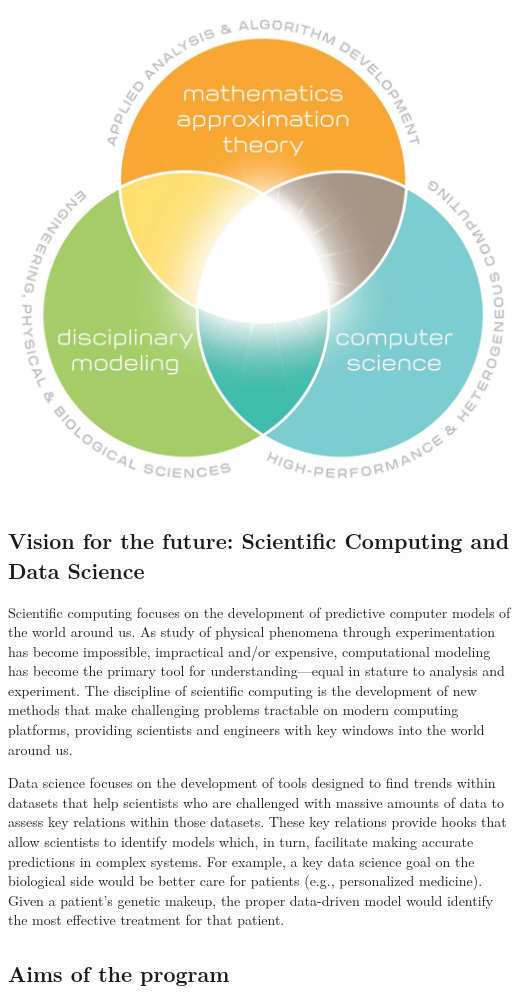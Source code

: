 \documentclass[%
oneside,                 %
final,                   %
10pt]{article}
\begin{document}
\centerline{\includegraphics[width=0.6\linewidth]{figslides/cs.jpg}}

\vspace{6mm}

\subsection*{Vision for the future: Scientific Computing and Data Science}

Scientific computing focuses on the development of predictive computer
models of the world around us. As study of physical phenomena through
experimentation has become impossible, impractical and/or expensive,
computational modeling has become the primary tool for
understanding—equal in stature to analysis and experiment. 
The discipline of scientific computing
is the development of new methods that make challenging problems
tractable on modern computing platforms, providing scientists and
engineers with key windows into the world around us.

Data science focuses on the development of tools designed to find
trends within datasets that help scientists who are challenged with
massive amounts of data to assess key relations within those
datasets. These key relations provide hooks that allow scientists to
identify models which, in turn, facilitate making accurate predictions
in complex systems. For example, a key data science goal on the
biological side would be better care for patients (e.g., personalized
medicine). Given a patient’s genetic makeup, the proper data-driven
model would identify the most effective treatment for that patient.

\subsection*{Aims of the program}
\end{document}
